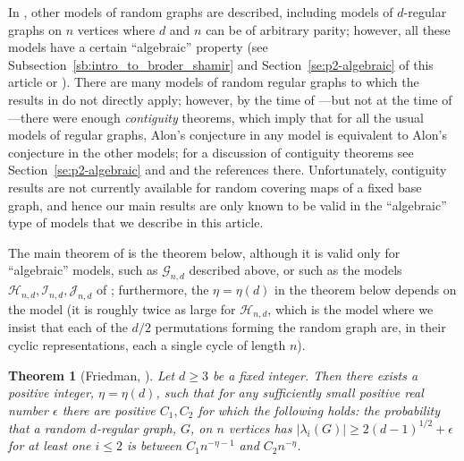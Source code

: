 \documentclass{memo-l}
\theoremstyle{plain}
\newtheorem{theorem}{Theorem}[section]
\theoremstyle{definition}
\numberwithin{section}{chapter}
\numberwithin{equation}{chapter}
\theoremstyle{plain}
\theoremstyle{definition}
\newcommand\cG{\mathcal{G}}
\newcommand\cH{\mathcal{H}}
\newcommand\cI{\mathcal{I}}
\newcommand\cJ{\mathcal{J}}
\begin{document}
In \cite{friedman_alon}, other models of random graphs are described,
including models of $d$-regular graphs on $n$ vertices where $d$ and
$n$ can be of arbitrary parity; however, all these models have a 
certain ``algebraic'' property (see 
Subsection~\ref{sb:intro_to_broder_shamir}
and Section~\ref{se:p2-algebraic} of
this article or \cite{friedman_alon}).  There are many models of random
regular graphs to which the results in \cite{friedman_alon} do not
directly apply; however, by the time of \cite{friedman_alon}---but
not at the time of \cite{broder}---there were enough
{\em contiguity} theorems, which imply that for all the usual models
of regular graphs, Alon's conjecture in any model is equivalent
to Alon's conjecture in the other models; for a discussion
of contiguity theorems see Section~\ref{se:p2-algebraic} and
\cite{friedman_alon}
and the references there.
Unfortunately, contiguity results are not currently available for
random covering maps of a fixed base graph, and hence our main
results are only known to be valid in the ``algebraic'' type of models
that we describe in this article.

The main theorem of \cite{friedman_alon} is the theorem below, although
it is valid only for ``algebraic'' models, such as
$\cG_{n,d}$ described above, or such as the models
$\cH_{n,d},\cI_{n,d},\cJ_{n,d}$ of \cite{friedman_alon};
furthermore, the $\eta=\eta(d)$ in the theorem below depends on the model
(it is roughly twice as large for $\cH_{n,d}$, 
which is the model where we insist that each
of the
$d/2$ permutations forming the random graph are, in their cyclic
representations, each a single cycle of length $n$).

\begin{theorem}[Friedman, \cite{friedman_alon}]
\label{th:Friedman_Alon}
Let $d\ge 3$ be a fixed integer.  Then there
exists a positive integer, $\eta=\eta(d)$, such that
for any sufficiently small positive real number $\epsilon$ there are
positive $C_1,C_2$ for which the following holds:
the probability that a random $d$-regular graph, $G$,
on $n$ vertices has $|\lambda_i(G)|\ge 2(d-1)^{1/2}+\epsilon$ for
at least one $i\le 2$ is between $C_1 n^{-\eta-1}$ and
$C_2 n^{-\eta}$.
\end{theorem}
\end{document}
